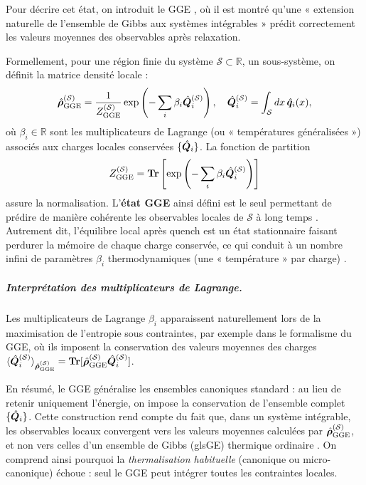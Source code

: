\medskip

Pour décrire cet état, on introduit le \gls{GGE} \cite{rigol2007relaxation}, où il est montré qu’une « extension naturelle de l’ensemble de Gibbs aux systèmes intégrables » prédit correctement les valeurs moyennes des observables après relaxation.  

\smallskip

Formellement, pour une région finie du système $\mathcal{S} \subset \mathbb{R}$, \ie un sous-système,  on définit la matrice densité locale :
\begin{eqnarray}
	\hat{\bm{\rho}}^{(\mathcal{S})}_{\mathrm{GGE}} = \frac{1}{Z^{(\mathcal{S})}_{\mathrm{GGE}}}\exp \left ( - \sum_i \beta_i \hat{\bm{Q}}_i^{(\mathcal{S})} \right), \quad \hat{\bm{Q}}_i^{(\mathcal{S})} = \int_\mathcal{S} dx \, \hat{\bm{q}}_i(x), \label{chap.TBA.op.rho.S}	
\end{eqnarray}
où $\beta_i \in \mathbb{R}$ sont les multiplicateurs de Lagrange (ou « températures généralisées ») associés aux charges locales conservées $\{\hat{\bm{Q}}_i\}$. La fonction de partition 
\begin{eqnarray}
	Z^{(\mathcal{S})}_{\mathrm{GGE}} = \bm{\mathrm{Tr}}\left [\exp \left( - \sum_i \beta_i \hat{\bm{Q}}_i^{(\mathcal{S})} \right ) \right ]  \label{chap.TBA.op.Z.S}	
\end{eqnarray}
 assure la normalisation. L’{\bf état \gls{GGE}} ainsi défini est le seul permettant de prédire de manière cohérente les observables locales de $\mathcal{S}$ à long temps \cite{Nardis_2016}. Autrement dit, l’équilibre local après quench est un état stationnaire faisant perdurer la mémoire de chaque charge conservée, ce qui conduit à un nombre infini de paramètres $\beta_i$ thermodynamiques (une « température » par charge) \cite{Nardis_2017}.
 
 \medskip

 \subparagraph{Interprétation des multiplicateurs de Lagrange.}
Les multiplicateurs de Lagrange $\beta_i$ apparaissent naturellement lors de la maximisation de l'entropie sous contraintes, par exemple dans le formalisme du \gls{GGE}, où ils imposent la conservation des valeurs moyennes des charges $\langle \hat{\bm{Q}}_i^{(\mathcal{S})} \rangle_{\hat{\bm{\rho}}^{(\mathcal{S})}_{\mathrm{GGE}}} = \bm{\mathrm{Tr}}[\hat{\bm{\rho}}^{(\mathcal{S})}_{\mathrm{GGE}} \hat{\bm{Q}}_i^{(\mathcal{S})}]   $.

\medskip

En résumé, le \gls{GGE} généralise les ensembles canoniques standard : au lieu de retenir uniquement l’énergie, on impose la conservation de l’ensemble complet $\{\hat{\bm{Q}}_i \}$. Cette construction rend compte du fait que, dans un système intégrable, les observables locaux convergent vers les valeurs moyennes calculées par $\hat{\bm{\rho}}^{(\mathcal{S})}_{\mathrm{GGE}}$, et non vers celles d’un ensemble de Gibbs (gls{GE}) thermique ordinaire \cite{Nardis_2016,rigol2007relaxation}. On comprend ainsi pourquoi la {\em thermalisation habituelle} (canonique ou micro-canonique) échoue : seul le \gls{GGE} peut intégrer toutes les contraintes locales.

